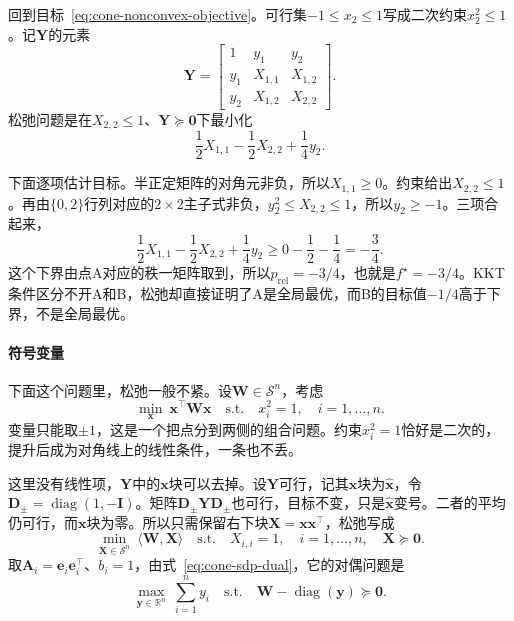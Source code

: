 \begin{example}[松弛证明全局最优]
\label{ex:cone-relax-nonconvex}
回到目标~\eqref{eq:cone-nonconvex-objective}。可行集$-1\leq x_2\leq1$写成二次约束$x_2^2\leq1$。记$\bm{Y}$的元素
\[
 \bm{Y}=\begin{bmatrix}1&y_1&y_2\\y_1&X_{1,1}&X_{1,2}\\y_2&X_{1,2}&X_{2,2}\end{bmatrix}.
\]
松弛问题是在$X_{2,2}\leq1$、$\bm{Y}\succeq\bm{0}$下最小化
\[
 \frac12X_{1,1}-\frac12X_{2,2}+\frac14y_2.
\]

下面逐项估计目标。半正定矩阵的对角元非负，所以$X_{1,1}\geq0$。约束给出$X_{2,2}\leq1$。再由$\{0,2\}$行列对应的$2\times2$主子式非负，$y_2^2\leq X_{2,2}\leq1$，所以$y_2\geq-1$。三项合起来，
\[
 \frac12X_{1,1}-\frac12X_{2,2}+\frac14y_2\geq0-\frac12-\frac14=-\frac34.
\]
这个下界由点A对应的秩一矩阵取到，所以$p_{\mathrm{rel}}=-3/4$，也就是$f^\star=-3/4$。KKT条件区分不开A和B，松弛却直接证明了A是全局最优，而B的目标值$-1/4$高于下界，不是全局最优。
\end{example}

\paragraph{符号变量}
下面这个问题里，松弛一般不紧。设$\bm{W}\in\mathcal{S}^n$，考虑
\begin{equation}
 \min_{\bm{x}}\ \bm{x}^\top\bm{W}\bm{x}\quad\text{s.t.}\quad x_i^2=1,\quad i=1,\ldots,n.
 \label{eq:cone-sign-problem}
\end{equation}
变量只能取$\pm1$，这是一个把点分到两侧的组合问题。约束$x_i^2=1$恰好是二次的，提升后成为对角线上的线性条件，一条也不丢。

这里没有线性项，$\bm{Y}$中的$\bm{x}$块可以去掉。设$\bm{Y}$可行，记其$\bm{x}$块为$\hat{\bm{x}}$，令$\bm{D}_{\pm}=\operatorname{diag}(1,-\bm{I})$。矩阵$\bm{D}_{\pm}\bm{Y}\bm{D}_{\pm}$也可行，目标不变，只是$\hat{\bm{x}}$变号。二者的平均仍可行，而$\bm{x}$块为零。所以只需保留右下块$\bm{X}=\bm{x}\bm{x}^\top$，松弛写成
\begin{equation}
 \min_{\bm{X}\in\mathcal{S}^n}\ \langle\bm{W},\bm{X}\rangle\quad\text{s.t.}\quad X_{i,i}=1,\quad i=1,\ldots,n,\quad\bm{X}\succeq\bm{0}.
 \label{eq:cone-sign-relax}
\end{equation}
取$\bm{A}_i=\bm{e}_i\bm{e}_i^\top$、$b_i=1$，由式~\eqref{eq:cone-sdp-dual}，它的对偶问题是
\begin{equation}
 \max_{\bm{y}\in\mathbb{R}^n}\ \sum_{i=1}^ny_i\quad\text{s.t.}\quad\bm{W}-\operatorname{diag}(\bm{y})\succeq\bm{0}.
 \label{eq:cone-sign-dual}
\end{equation}

